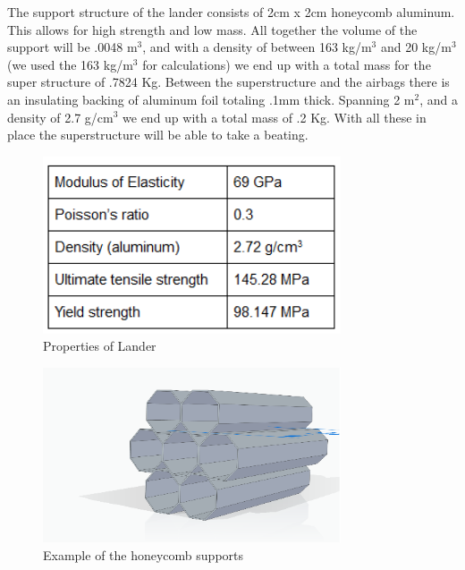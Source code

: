\documentclass[%
 portrait,
 aapm,
 mph,%
 amsmath,amssymb,
 reprint,%
]{revtex4-2}
\begin{document}
The support structure of the lander consists of 2cm x 2cm honeycomb aluminum.  This allows for high strength and low mass.  All together the volume of the support will be .0048 m\begin{math}^3 \end{math}, and with a density of between 163 kg/m\begin{math}^3 \end{math} and 20 kg/m\begin{math}^3 \end{math} (we used the 163 kg/m\begin{math}^3 \end{math} for calculations) we end up with a total mass for the super structure of .7824 Kg.  Between the superstructure and the airbags there is an insulating backing of aluminum foil totaling .1mm thick.  Spanning 2 m\begin{math}^2 \end{math}, and a density of 2.7 g/cm\begin{math}^3 \end{math} we end up with a total mass of .2 Kg.  With all these in place the superstructure will be able to take a beating.
\begin{figure}[h!]
  \includegraphics[width=250pt]{DescentandLanding/LanderTable.png}
   \caption{Properties of Lander}
\end{figure} 
\begin{figure}[h!]
  \includegraphics[width=250pt]{DescentandLanding/HoneyCombSupports.png}
   \caption{Example of the honeycomb supports}
\end{figure} 
\end{document}
